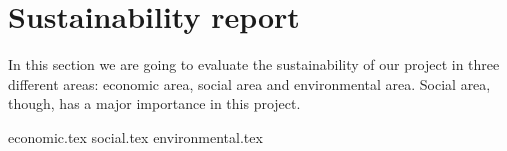 \section{Sustainability report}
In this section we are going to evaluate the sustainability of our project in three different areas: economic area, social area and environmental area. Social area, though, has a major importance in this project.

{economic.tex}
{social.tex}
{environmental.tex}